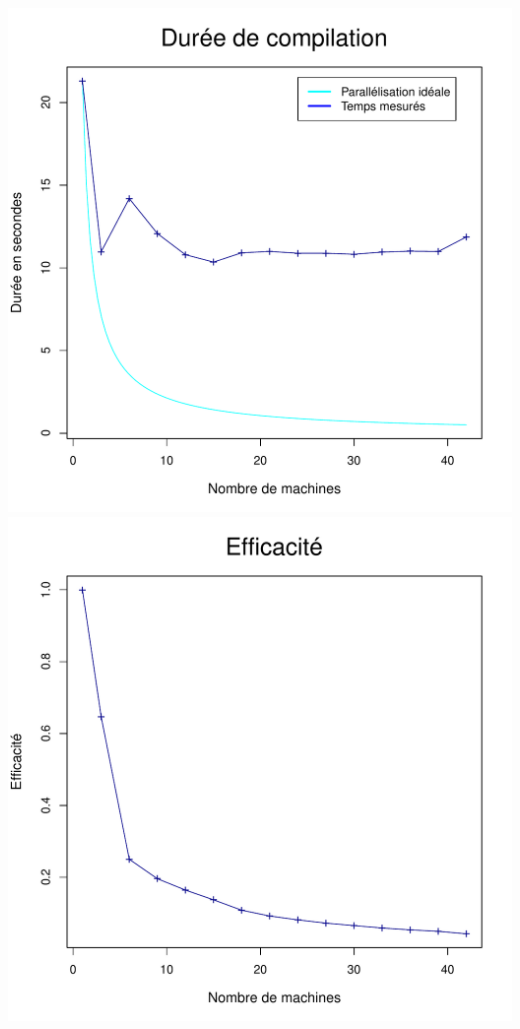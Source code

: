 \documentclass[a4paper, 11pt, titlepage]{article}
\begin{document}
\begin{center}
    \includegraphics[scale=0.45]{res/sujet_makefiles_blender_249_Makefile_nth8.pdf}
    \includegraphics[scale=0.45]{res/sujet_makefiles_blender_249_Makefile_nth8_eff.pdf}

\end{center}
\end{document}

